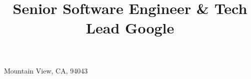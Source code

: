 \title{\normalsize
	Senior Software Engineer \& Tech Lead\newline
	Google
}                       %
\address{1600 Amphitheatre Pkwy\\Attn Gdinatale\\}{Mountain View, CA, 94043}    %




\newcommand{\see}[1]{\hfill{\itshape\color{see}\footnotesize{}see #1}}

\newcommand{\br}{\ifinner, \else\\\fi}

\newcommand{\gh}[3]{\href{https://github.com/#1/#2/commits?author=dinatale2}{#3}}
\newcommand{\ghllnl}[2]{\gh{llnl}{#1}{#2}}
\newcommand{\ghzfs}[2]{\gh{zfsonlinux}{#1}{#2}}
\newcommand{\ghopensfs}[2]{\gh{opensfs}{#1}{#2}}
\newcommand{\lustre}[0]{\href{https://review.whamcloud.com/\#/q/owner:dinatale2@llnl.gov+status:merged}{Lustre}}

\makeatletter
\def\@bibitem#1{%
	\def\mykey{#1}%
	\item\if@filesw\immediate\write\@auxout {\string\bibcite{#1}%
	{\the\value{\@listctr}}}\fi\ignorespaces}

